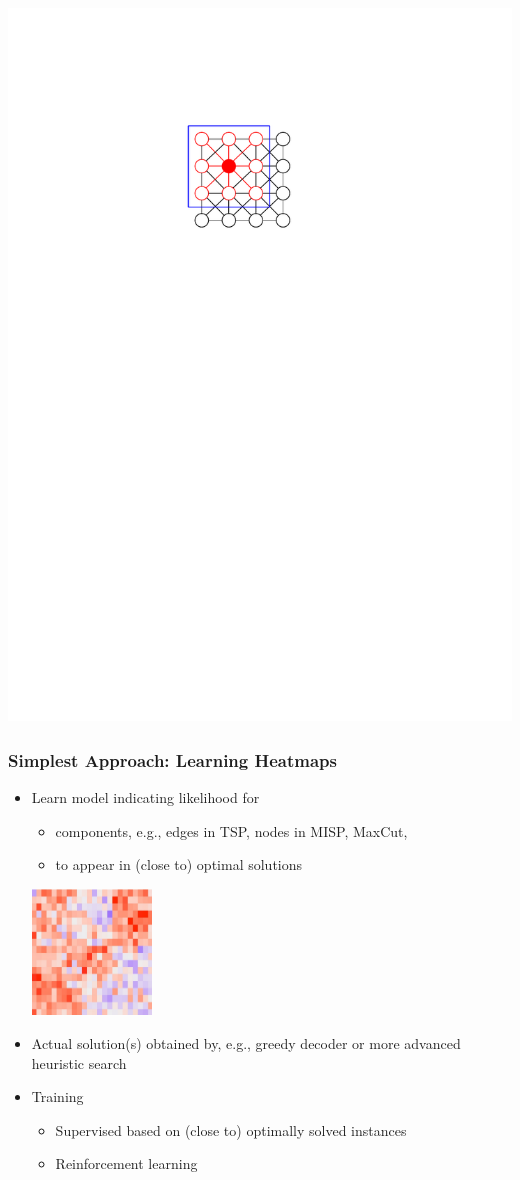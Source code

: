 \documentclass[aspectratio=1610]{beamer}
\newcommand{\important}[1]{{\color{green!60!black}#1}}
\begin{document}
\begin{frame}
\begin{itemize}
	\medskip
	{\includegraphics[width=0.7\linewidth, page=3]{graphics/graphics.pdf}}\\[2ex]
\end{itemize} 
\end{frame}


\begin{frame}
	\frametitle{Simplest Approach: Learning Heatmaps}

	\begin{itemize}
		\itemsep2ex
		\item Learn model indicating likelihood for
		\begin{itemize}
			\item components, e.g., edges in TSP, nodes in MISP, MaxCut,
			\item to appear in (close to) optimal solutions
		\end{itemize}
		\includegraphics[width=0.25\textwidth]{graphics/heatmap.jpg}
		\item Actual solution(s) obtained by, e.g., greedy decoder or more advanced heuristic search
		\item Training
		\begin{itemize}
			\item Supervised based on (close to) optimally solved instances
			\item Reinforcement learning
		\end{itemize}
	\end{itemize}

\end{frame}
\end{document}
